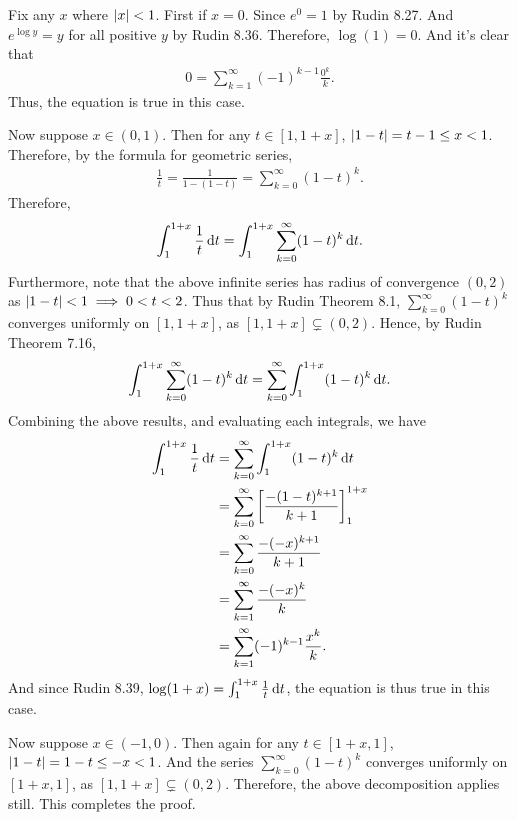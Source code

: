 \documentclass[12pt]{article}
\begin{document}
\begin{fproof}[1(a)]
Fix any \(x\) where \(\left\lvert x \right\rvert < 1\).
First if \(x = 0\). Since \(e^{0} = 1\) by Rudin 8.27. And \(e^{\log y} = y\) for all positive \(y\) by Rudin 8.36. Therefore, \(\log(1) = 0\).
And it's clear that 
\begin{align*}
    0 =\sum_{k=1}^{\infty} (-1)^{k-1} \frac{0^k}{k}.
\end{align*}
Thus, the equation is true in this case.

Now suppose \(x \in (0,1)\).
Then for any \(t \in [1, 1+x]\), \(\left\lvert 1-t \right\rvert = t-1 \leq x < 1\).
Therefore, by the formula for geometric series,
\begin{align*}
    \frac{1}{t} = \frac{1}{1-(1-t)} = \sum_{k=0}^{\infty} (1-t)^k.
\end{align*}
Therefore,
\begin{align*}
    \int_{1}^{1+x} \frac{1}{t} \mathop{}\!\mathrm{d} t = \int_{1}^{1+x} \sum_{k=0}^{\infty} (1-t)^k \mathop{}\!\mathrm{d} t.
\end{align*}
Furthermore, note that the above infinite series has radius of convergence \((0,2)\) as \(\left\lvert 1-t \right\rvert < 1 \implies 0<t<2\).
Thus that by Rudin Theorem 8.1, \(\sum_{k=0}^{\infty} (1-t)^k\) converges uniformly on \([1, 1 + x]\), as \([1, 1 + x] \subsetneq (0,2)\).
Hence, by Rudin Theorem 7.16,
\begin{align*}
    \int_{1}^{1+x} \sum_{k=0}^{\infty} (1-t)^k \mathop{}\!\mathrm{d} t = \sum_{k=0}^{\infty} \int_{1}^{1+x} (1-t)^k \mathop{}\!\mathrm{d} t. 
\end{align*}
Combining the above results, and evaluating each integrals, we have
\begin{align*}
    \int_{1}^{1+x} \frac{1}{t} \mathop{}\!\mathrm{d} t &= \sum_{k=0}^{\infty} \int_{1}^{1+x} (1-t)^k \mathop{}\!\mathrm{d} t \\
    &= \sum_{k=0}^{\infty} \left[ \frac{-(1-t)^{k+1}}{k+1} \right]_{1}^{1+x} \\
    &= \sum_{k=0}^{\infty} \frac{-(-x)^{k+1}}{k+1}\\
    &=\sum_{k=1}^{\infty} \frac{-(-x)^{k}}{k}\\
    &= \sum_{k=1}^{\infty} (-1)^{k-1}\frac{x^k}{k}.
\end{align*}
And since Rudin 8.39, \(\log(1+x) = \int_{1}^{1+x} \frac{1}{t} \mathop{}\!\mathrm{d} t\), the equation is thus true in this case.

Now suppose \(x \in (-1,0)\).
Then again for any \(t \in [1+x, 1]\), \(\left\lvert 1-t \right\rvert = 1-t \leq -x < 1\).
And the series \(\sum_{k=0}^{\infty} (1-t)^k\) converges uniformly on \([1+x,1]\), as \([1, 1+x] \subsetneq (0,2)\).
Therefore, the above decomposition applies still.
This completes the proof.
\end{fproof}
\end{document}
